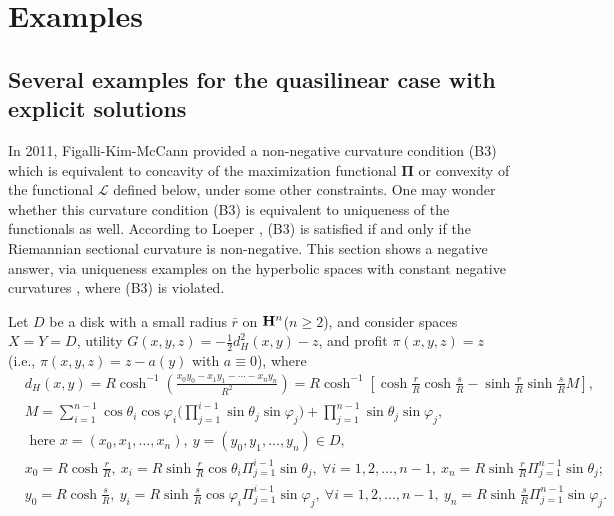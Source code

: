 \chapter{Examples}\label{chapter:examples}




\section{Several examples for the quasilinear case with explicit solutions}
In 2011, Figalli-Kim-McCann \cite{FigalliKimMcCann11} provided a non-negative curvature condition (B3) which is equivalent to concavity of the maximization functional $\pmb \Pi$ or convexity of the functional $\mathcal{L}$ defined below, under some other constraints. One may wonder whether this curvature condition (B3) is equivalent to uniqueness of the functionals as well. According to Loeper \cite{Loeper09}, (B3) is satisfied if and only if the Riemannian sectional curvature is non-negative.
This section shows a negative answer, via uniqueness examples on the hyperbolic spaces with constant negative curvatures%
, where (B3) is violated. \medskip

Let $D$ be a disk with a small radius $\bar{r}$ on ${\mathbf H}^n$($n\ge 2$), and consider spaces $X= Y = D$, utility $G(x,y,z)=-\frac{1}{2}d_H^2(x,y) -z$, and profit $\pi(x,y,z) = z$ (i.e., $\pi(x,y,z) = z -a(y)$ with $a \equiv 0$), where
\begin{equation}\label{distanceh}
\begin{split}
&d_H(x,y)= R\cosh^{-1}(\frac{x_0y_0-x_1y_1-\cdots -x_ny_n}{R^2})= R\cosh^{-1}[\cosh \frac{r}{R}\cosh \frac{s}{R}-\sinh \frac{r}{R}\sinh\frac{s}{R} M],\\
&M=\sum_{i=1}^{n-1}\cos\theta_i \cos\varphi_i\Big(\prod_{j=1}^{i-1} \sin\theta_j\sin\varphi_j\Big)+ \prod_{j=1}^{n-1} \sin\theta_j\sin\varphi_j,\\
&\text{ here } x=(x_0,x_1,\dots, x_n),~y=(y_0,y_1,\dots, y_n) \in D,\\& x_0 = R\cosh \frac{r}{R},~ x_i = R\sinh \frac{r}{R}\cos\theta_i \Pi_{j=1}^{i-1}\sin \theta_j, ~\forall i=1,2,...,n-1, ~x_n = R\sinh \frac{r}{R} \Pi_{j=1}^{n-1}\sin \theta_j;\\
&y_0 = R\cosh \frac{s}{R},~ y_i = R\sinh \frac{s}{R}\cos\varphi_i \Pi_{j=1}^{i-1}\sin \varphi_j, ~\forall i=1,2,...,n-1,~ y_n = R\sinh \frac{s}{R} \Pi_{j=1}^{n-1}\sin \varphi_j.
\end{split}
\end{equation} 

